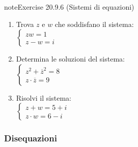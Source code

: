 \documentclass[letterpaper,10pt,italian]{jupyterBook}
\begin{document}
\begin{sphinxadmonition}{note}{Exercise 20.9.6 (Sistemi di equazioni)}
\begin{enumerate}
\item {} 
\sphinxAtStartPar
Trova \(z\) e \(w\) che soddisfano il sistema:\\
\(\begin{cases} 
z w = 1 \\
z - w = i 
\end{cases}\)

\item {} 
\sphinxAtStartPar
Determina le soluzioni del sistema:\\
\(\begin{cases} 
z^2 + \overline{z}^2 = 8 \\
z \cdot \overline{z} = 9 
\end{cases}\)

\item {} 
\sphinxAtStartPar
Risolvi il sistema:\\
\(\begin{cases} 
z + w = 5 + i \\
z \cdot w = 6 - i 
\end{cases}\)

\end{enumerate}
\end{sphinxadmonition}


\subsubsection{Disequazioni}
\label{\detokenize{ch/algebra/complex-algebra-problems:disequazioni}}\label{\detokenize{ch/algebra/complex-algebra-problems:math-hs-algebra-complex-problems-equations-ineq}} \label{exercise:ch/algebra/complex-algebra-problems-exercise-6}
\end{document}
